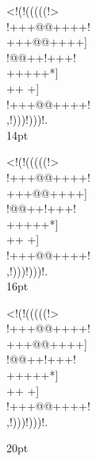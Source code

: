 \documentclass[12pt]{article}
\begin{document}
\begin{center}
\newpage
{
{
\gnos%
<!(!(((((!>\\
!+++@@++++!\\
+++@@++++]\\
!@@++!+++!\\
+++++*]\\
++
+]\\
!+++@@++++!\\
,!)))!)))!.\\
}
}
14pt

{
\gnos%
<!(!(((((!>\\
!+++@@++++!\\
+++@@++++]\\
!@@++!+++!\\
+++++*]\\
++
+]\\
!+++@@++++!\\
,!)))!)))!.\\
}
16pt

{
\gnos%
<!(!(((((!>\\
!+++@@++++!\\
+++@@++++]\\
!@@++!+++!\\
+++++*]\\
++
+]\\
!+++@@++++!\\
,!)))!)))!.\\
\par
}
20pt

\newpage


\end{center}
\end{document}
